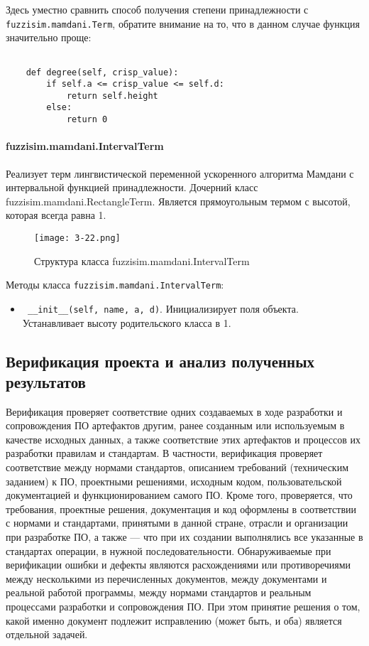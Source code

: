 Здесь уместно сравнить способ получения степени принадлежности с \lstinline!fuzzisim.mamdani.Term!,
обратите внимание на то, что в данном случае функция значительно проще:
\begin{lstlisting}[style=pythonstyle,caption={  }, label=lst:func:1]

	def degree(self, crisp_value):
		if self.a <= crisp_value <= self.d:
			return self.height
		else:
			return 0
\end{lstlisting}




\paragraph{fuzzisim.mamdani.IntervalTerm}

Реализует терм лингвистической переменной ускоренного алгоритма Мамдани с интервальной функцией принадлежности. Дочерний класс fuzzisim.mamdani.RectangleTerm. Является прямоугольным термом с высотой, которая всегда равна 1.

\begin{figure}[ht]
	\centering
	\texttt{[image: 3-22.png]}
	\caption{ Структура класса fuzzisim.mamdani.IntervalTerm}
\end{figure}



Методы класса \lstinline!fuzzisim.mamdani.IntervalTerm!:
\begin{itemize}
	\item \lstinline! __init__(self, name, a, d)!. Инициализирует поля объекта.  Устанавливает высоту родительского класса в 1.
\end{itemize}

\subsection{Верификация проекта и анализ полученных результатов}

Верификация проверяет соответствие одних создаваемых в ходе разработки и сопровождения ПО артефактов другим, ранее созданным или используемым в качестве исходных данных, а также соответствие этих артефактов и процессов их разработки правилам и стандартам. В частности, верификация проверяет соответствие между нормами стандартов, описанием требований (техническим заданием) к ПО, проектными решениями, исходным кодом, пользовательской документацией и функционированием самого ПО. Кроме того, проверяется, что требования, проектные решения, документация и код оформлены в соответствии с нормами и стандартами, принятыми в данной стране, отрасли и организации при разработке ПО, а также — что при их создании выполнялись все указанные в стандартах операции, в нужной последовательности. Обнаруживаемые при верификации ошибки и дефекты являются расхождениями или противоречиями между несколькими из перечисленных документов, между документами и реальной работой программы, между нормами стандартов и реальным процессами разработки и сопровождения ПО. При этом принятие решения о том, какой именно документ подлежит исправлению (может быть, и оба) является отдельной задачей.

